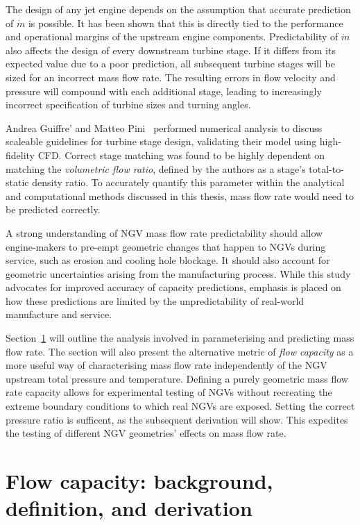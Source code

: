 \documentclass[a4paper, 11pt, oneside]{report}
\begin{document}
The design of any jet engine depends on the assumption that accurate prediction of $\dot{m}$ is possible. It has been shown that this is directly tied to the performance and operational margins of the upstream engine components. Predictability of $\dot{m}$ also affects the design of every downstream turbine stage. If it differs from its expected value due to a poor prediction, all subsequent turbine stages will be sized for an incorrect mass flow rate. The resulting errors in flow velocity and pressure will compound with each additional stage, leading to increasingly incorrect specification of turbine sizes and turning angles.

Andrea Guiffre' and Matteo Pini~\cite{guiffre_design_guidelines} performed numerical analysis to discuss scaleable guidelines for turbine stage design, validating their model using high-fidelity CFD.  Correct stage matching was found to be highly dependent on matching the \textit{volumetric flow ratio}, defined by the authors as a stage's total-to-static density ratio. To accurately quantify this parameter within the analytical and computational methods discussed in this thesis, mass flow rate would need to be predicted correctly.

A strong understanding of NGV mass flow rate predictability should allow engine-makers to pre-empt geometric changes that happen to NGVs during service, such as erosion and cooling hole blockage. It should also account for geometric uncertainties arising from the manufacturing process. While this study advocates for improved accuracy of capacity predictions, emphasis is placed on how these predictions are limited by the unpredictability of real-world manufacture and service.

Section~\ref{flow_capacity_background_definition_and_derivation} will outline the analysis involved in parameterising and predicting mass flow rate. The section will also present the alternative metric of \textit{flow capacity} as a more useful way of characterising mass flow rate independently of the NGV upstream total pressure and temperature. Defining a purely geometric mass flow rate capacity allows for experimental testing of NGVs without recreating the extreme boundary conditions to which real NGVs are exposed. Setting the correct pressure ratio is sufficent, as the subsequent derivation will show. This expedites the testing of different NGV geometries' effects on mass flow rate.

\section{Flow capacity: background, definition, and derivation}
\label{flow_capacity_background_definition_and_derivation}
\end{document}
